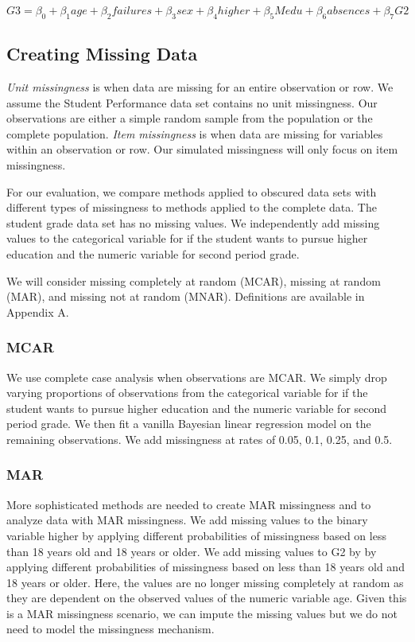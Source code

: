 \documentclass[11pt]{article}
\begin{document}
$$G3 = \beta_0 + \beta_1 age + \beta_2 failures + \beta_3 sex + \beta_4 higher + \beta_5 Medu + \beta_6 absences + \beta_7 G2$$

\subsection{Creating Missing Data}

\textit{Unit missingness} is when data are missing for an entire observation or row. We assume the Student Performance data set contains no unit missingness. Our observations are either a simple random sample from the population or the complete population. \textit{Item missingness} is when data are missing for variables within an observation or row. Our simulated missingness will only focus on item missingness.

For our evaluation, we compare methods applied to obscured data sets with different types of missingness to methods applied to the complete data. The student grade data set has no missing values. We independently add missing values to the categorical variable for if the student wants to pursue higher education and the numeric variable for second period grade. 

We will consider missing completely at random (MCAR), missing at random (MAR), and missing not at random (MNAR). Definitions are available in Appendix A. 

\subsubsection{MCAR}

We use complete case analysis when observations are MCAR. We simply drop varying proportions of observations from the categorical variable for if the student wants to pursue higher education and the numeric variable for second period grade. We then fit a vanilla Bayesian linear regression model on the remaining observations. We add missingness at rates of 0.05, 0.1, 0.25, and 0.5.

\subsubsection{MAR}

More sophisticated methods are needed to create MAR missingness and to analyze data with MAR missingness. We add missing values to the binary variable higher by applying different probabilities of missingness based on less than 18 years old and 18 years or older. We add missing values to G2 by by applying different probabilities of missingness based on less than 18 years old and 18 years or older. Here, the values are no longer missing completely at random as they are dependent on the observed values of the numeric variable age. Given this is a MAR missingness scenario, we can impute the missing values but we do not need to model the missingness mechanism. 
\end{document}
